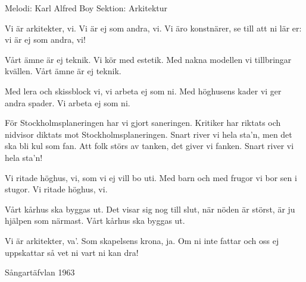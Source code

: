 \begin{song}

\begin{songmeta}
Melodi: Karl Alfred Boy
Sektion: Arkitektur
\end{songmeta}

\begin{songtext}
Vi är arkitekter, vi.
Vi är ej som andra, vi.
Vi äro konstnärer,
se till att ni lär er:
vi är ej som andra, vi!

Vårt ämne är ej teknik.
Vi kör med estetik.
Med nakna modellen
vi tillbringar kvällen.
Vårt ämne är ej teknik.

Med lera och skissblock vi,
vi arbeta ej som ni.
Med höghusens kader
vi ger andra spader.
Vi arbeta ej som ni.

För Stockholmsplaneringen
har vi gjort saneringen.
Kritiker har riktats
och nidvisor diktats
mot Stockholmsplaneringen.
\newpage
Snart river vi hela sta'n,
men det ska bli kul som fan.
Att folk störs av tanken,
det giver vi fanken.
Snart river vi hela sta'n!

Vi ritade höghus, vi,
som vi ej vill bo uti.
Med barn och med frugor
vi bor sen i stugor.
Vi ritade höghus, vi.

Vårt kårhus ska byggas ut.
Det visar sig nog till slut,
när nöden är störst,
är ju hjälpen som närmast.
Vårt kårhus ska byggas ut.

Vi är arkitekter, va'.
Som skapelsens krona, ja.
Om ni inte fattar
och oss ej uppskattar
så vet ni vart ni kan dra!
\end{songtext}

\begin{songnotes}
Sångartäfvlan 1963
\end{songnotes}
\end{song}